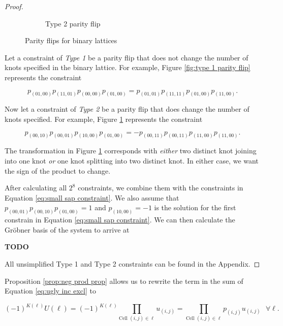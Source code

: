 \documentclass[12pt]{article}
\theoremstyle{plain}
\theoremstyle{definition}
\theoremstyle{remark}
\theoremstyle{definition}
\newcommand{\lablnode}[3]{\node[shape=circle,draw=none,fill=none, inner sep=0pt,minimum size=5pt] (A) at ( #1 , #2 ) {#3};}
\begin{document}
\begin{proof}
\begin{figure}[h!]
\begin{center}
\begin{subfigure}{0.4\textwidth}
    \caption{Type 2 parity flip}
    \label{fig:type 2 parity flip}
\end{subfigure}

\end{center}
\caption{Parity flips for binary lattices}
\label{fig:messy mosaic example}
\end{figure}

Let a constraint of \textit{Type 1} be a parity flip that does not change the number of knots specified in the binary lattice. For example, Figure \ref{fig:type 1 parity flip} represents the constraint

\begin{equation}
    p_{(01,00)}p_{(11,01)}p_{(00,00)}p_{(01,00)} = p_{(01,01)}p_{(11,11)}p_{(01,00)}p_{(11,00)}.
\end{equation}

Now let a constraint of \textit{Type 2} be a parity flip that does change the number of knots specified. For example, Figure \ref{fig:type 2 parity flip} represents the constraint

\begin{equation}
    p_{(00,10)}p_{(00,01)}p_{(10,00)}p_{(01,00)} = -p_{(00,11)}p_{(00,11)}p_{(11,00)}p_{(11,00)}.
\end{equation}

The transformation in Figure \ref{fig:type 2 parity flip} corresponds with \textit{either} two distinct knot joining into one knot \textit{or} one knot splitting into two distinct knot. In either case, we want the sign of the product to change. 

After calculating all $2^8$ constraints, we combine them with the constraints in Equation \ref{eq:small sap constraint}. We also assume that $p_{(00,01)} p_{(00,10)} p_{(01,00)} = 1$ and $p_{(10,00)} = -1$ is the solution for the first constrain in Equation \ref{eq:small sap constraint}. We can then calculate the  Gröbner basis of the system to arrive at

\textbf{TODO}

All unsimplified Type 1 and Type 2 constraints can be found in the Appendix.

\end{proof}

Proposition \ref{prop:neg prod prop} allows us to rewrite the term in the sum of Equation \ref{eq:ugly inc excl} to

\begin{equation}
    (-1)^{K(\ell)}U(\ell) = (-1)^{K(\ell)} \prod_{\text{Cell }(i,j) \in \ell} u_{(i,j)} = \prod_{\text{Cell }(i,j) \in \ell} p_{(i,j)}u_{(i,j)} \text{ $\forall \ell$}.
    \label{eq:term fix}
\end{equation}
\end{document}

